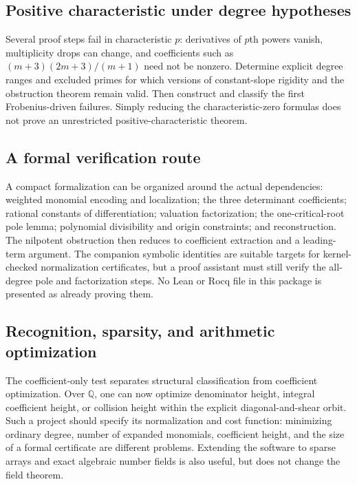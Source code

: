 \documentclass[11pt,a4paper]{article}
\numberwithin{equation}{section}
\theoremstyle{definition}
\theoremstyle{remark}
\newcommand{\Q}{\mathbb{Q}}
\begin{document}
\subsection{Positive characteristic under degree hypotheses}

Several proof steps fail in characteristic $p$: derivatives of $p$th
powers vanish, multiplicity drops can change, and coefficients such as
$(m+3)(2m+3)/(m+1)$ need not be nonzero. Determine explicit degree ranges
and excluded primes for which versions of constant-slope rigidity and
the obstruction theorem remain valid. Then construct and classify the
first Frobenius-driven failures. Simply reducing the characteristic-zero
formulas does not prove an unrestricted positive-characteristic theorem.

\subsection{A formal verification route}

A compact formalization can be organized around the actual dependencies:
weighted monomial encoding and localization; the three determinant
coefficients; rational constants of differentiation; valuation
factorization; the one-critical-root pole lemma; polynomial divisibility
and origin constraints; and reconstruction. The nilpotent obstruction
then reduces to coefficient extraction and a leading-term argument.
The companion symbolic identities are suitable targets for kernel-checked
normalization certificates, but a proof assistant must still verify the
all-degree pole and factorization steps. No Lean or Rocq file in this
package is presented as already proving them.

\subsection{Recognition, sparsity, and arithmetic optimization}

The coefficient-only test separates structural classification from
coefficient optimization. Over $\Q$, one can now optimize denominator
height, integral coefficient height, or collision height within the
explicit diagonal-and-shear orbit. Such a project should specify its
normalization and cost function: minimizing ordinary degree, number of
expanded monomials, coefficient height, and the size of a formal
certificate are different problems. Extending the software to sparse
arrays and exact algebraic number fields is also useful, but does not
change the field theorem.
\end{document}
